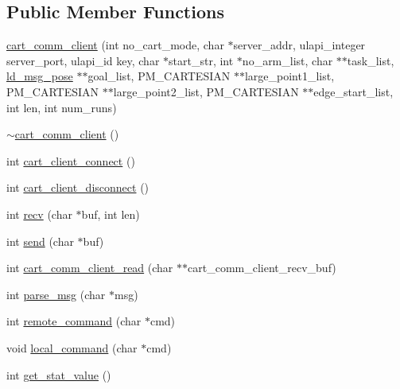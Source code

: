 \subsection*{Public Member Functions}
\begin{DoxyCompactItemize}
\item 
\mbox{\hyperlink{classcart__comm__client_a23497ab5b62437e0de0d14e1ee25de84}{cart\+\_\+comm\+\_\+client}} (int no\+\_\+cart\+\_\+mode, char $\ast$server\+\_\+addr, ulapi\+\_\+integer server\+\_\+port, ulapi\+\_\+id key, char $\ast$start\+\_\+str, int $\ast$no\+\_\+arm\+\_\+list, char $\ast$$\ast$task\+\_\+list, \mbox{\hyperlink{structld__msg__pose}{ld\+\_\+msg\+\_\+pose}} $\ast$$\ast$goal\+\_\+list, P\+M\+\_\+\+C\+A\+R\+T\+E\+S\+I\+AN $\ast$$\ast$large\+\_\+point1\+\_\+list, P\+M\+\_\+\+C\+A\+R\+T\+E\+S\+I\+AN $\ast$$\ast$large\+\_\+point2\+\_\+list, P\+M\+\_\+\+C\+A\+R\+T\+E\+S\+I\+AN $\ast$$\ast$edge\+\_\+start\+\_\+list, int len, int num\+\_\+runs)
\item 
\mbox{\hyperlink{classcart__comm__client_a197a75f7a27435690fabbb5870e08cf7}{$\sim$cart\+\_\+comm\+\_\+client}} ()
\item 
int \mbox{\hyperlink{classcart__comm__client_af1405a30bac4be39a1c37fe8b2f69791}{cart\+\_\+client\+\_\+connect}} ()
\item 
int \mbox{\hyperlink{classcart__comm__client_aef8aa79120c25ea0f343f20d740b32f2}{cart\+\_\+client\+\_\+disconnect}} ()
\item 
int \mbox{\hyperlink{classcart__comm__client_a673f4b5374d8a7e033375cd694ca4697}{recv}} (char $\ast$buf, int len)
\item 
int \mbox{\hyperlink{classcart__comm__client_ab0d981b90617457ec97b9a1a9bd9b003}{send}} (char $\ast$buf)
\item 
int \mbox{\hyperlink{classcart__comm__client_a7292b453e9e24b73d48d3047a635d06c}{cart\+\_\+comm\+\_\+client\+\_\+read}} (char $\ast$$\ast$cart\+\_\+comm\+\_\+client\+\_\+recv\+\_\+buf)
\item 
int \mbox{\hyperlink{classcart__comm__client_af4d47a079f2b85d4e26e08c1e6950b5b}{parse\+\_\+msg}} (char $\ast$msg)
\item 
int \mbox{\hyperlink{classcart__comm__client_a2fb097415fb6cdfcf6173e6f19f243e6}{remote\+\_\+command}} (char $\ast$cmd)
\item 
void \mbox{\hyperlink{classcart__comm__client_a2436ebf614302ff2aea8796d8ae6ba47}{local\+\_\+command}} (char $\ast$cmd)
\item 
int \mbox{\hyperlink{classcart__comm__client_a810796a4f52621b6d84307d42274dfd6}{get\+\_\+stat\+\_\+value}} ()

\end{DoxyCompactItemize}
